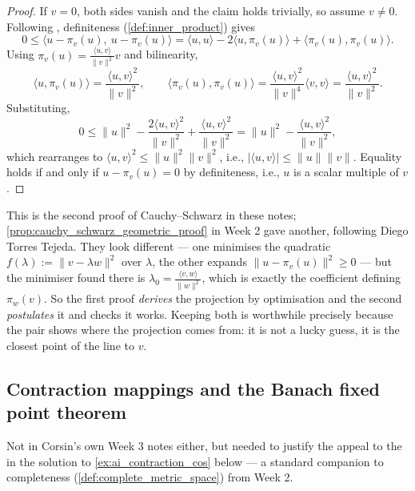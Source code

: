 \begin{proof}
If $v = 0$, both sides vanish and the claim holds trivially, so assume $v \neq 0$. Following
, definiteness (\cref{def:inner_product}) gives
\[0 \leq \langle u-\pi_v(u),\ u-\pi_v(u)\rangle = \langle u,u\rangle - 2\langle u,\pi_v(u)\rangle + \langle \pi_v(u),\pi_v(u)\rangle.\]
Using $\pi_v(u) = \tfrac{\langle u,v\rangle}{\|v\|^2}v$ and bilinearity,
\[\langle u,\pi_v(u)\rangle = \frac{\langle u,v\rangle^2}{\|v\|^2}, \qquad \langle \pi_v(u),\pi_v(u)\rangle = \frac{\langle u,v\rangle^2}{\|v\|^4}\langle v,v\rangle = \frac{\langle u,v\rangle^2}{\|v\|^2}.\]
Substituting,
\[0 \leq \|u\|^2 - \frac{2\langle u,v\rangle^2}{\|v\|^2} + \frac{\langle u,v\rangle^2}{\|v\|^2} = \|u\|^2 - \frac{\langle u,v\rangle^2}{\|v\|^2},\]
which rearranges to $\langle u,v\rangle^2 \leq \|u\|^2\|v\|^2$, i.e., $|\langle u,v\rangle| \leq \|u\|\|v\|$. Equality holds
if and only if $u - \pi_v(u) = 0$ by definiteness, i.e., $u$ is a scalar multiple of $v$.
\end{proof}

\begin{remark}
\label{rem:two_proofs_cauchy_schwarz}
This is the second proof of Cauchy--Schwarz in these notes;
\cref{prop:cauchy_schwarz_geometric_proof} in Week 2 gave another, following Diego Torres
Tejeda. They look different --- one minimises the quadratic
$f(\lambda) := \|v-\lambda w\|^2$ over $\lambda$, the other expands
$\|u-\pi_v(u)\|^2 \geq 0$ --- but the minimiser found there is
$\lambda_0 = \tfrac{\langle v,w\rangle}{\|w\|^2}$, which is exactly the coefficient defining
$\pi_w(v)$. So the first proof \emph{derives} the projection by optimisation and the second
\emph{postulates} it and checks it works. Keeping both is worthwhile precisely because the pair
shows where the projection comes from: it is not a lucky guess, it is the closest point of the
line to $v$.
\end{remark}

\subsection{Contraction mappings and the Banach fixed point theorem}

\begin{ainote}
Not in Corsin's own Week 3 notes either, but needed to justify the appeal to the  in the solution to \cref{ex:ai_contraction_cos} below --- a standard companion to
completeness (\cref{def:complete_metric_space}) from Week 2.
\end{ainote}

